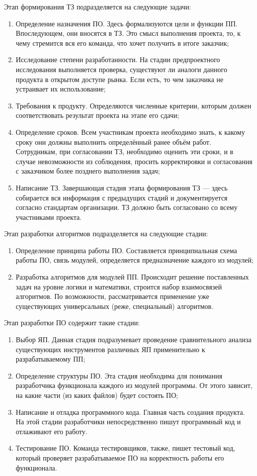 Этап формирования ТЗ подразделяется на следующие задачи:

\begin{enumerate}
	\item Определение назначения ПО. Здесь формализуются цели и функции ПП. Впоследующем, они вносятся в ТЗ. Это смысл выполнения проекта, то, к чему стремится вся его команда, что хочет получить в итоге заказчик;
	\item Исследование степени разработанности. На стадии предпроектного исследования выполняется проверка, существуют ли аналоги данного продукта в открытом доступе рынка. Если есть, то чем заказчика не устраивает их использование;
	\item Требования к продукту. Определяются численные критерии, которым должен соответствовать результат проекта на этапе его сдачи;
	\item Определение сроков. Всем участникам проекта необходимо знать, к какому сроку они должны выполнить определённый ранее объём работ. Сотрудникам, при согласовании ТЗ, необходимо оценить эти сроки, и в случае невозможности из соблюдения, просить корректировки и согласования с заказчиком более позднего выполнения задач;
	\item Написание ТЗ. Завершающая стадия этапа формирования ТЗ --- здесь собирается вся информация с предыдущих стадий и документируется согласно стандартам организации. ТЗ должно быть согласовано со всему участниками проекта.
\end{enumerate}

Этап разработки алгоритмов подразделяется на следующие стадии:
\begin{enumerate}
	\item Определение принципа работы ПО. Составляется принципиальная схема работы ПО, связь модулей, определяется предназначение каждого из модулей;
	\item Разработка алгоритмов для модулей ПП. Происходит решение поставленных задач на уровне логики и математики, строится набор взаимосвязей алгоритмов. По возможности, рассматривается применение уже существующих универсальных (реже, специальный) алгоритмов.
\end{enumerate}

Этап разработки ПО содержит такие стадии:
\begin{enumerate}
	\item Выбор ЯП. Данная стадия подразумевает проведение сравнительного анализа существующих инструментов различных ЯП применительно к разрабатываемому ПП;
	\item Определение структуры ПО. Эта стадия необходима для понимания разработчика функционала каждого из модулей программы. От этого зависит, на какие части (из каких файлов) будет состоять ПО;
	\item Написание и отладка программного кода. Главная часть создания продукта. На этой стадии разработчики непосредственно пишут программный код и отлаживают его работу.
	\item Тестирование ПО. Команда тестировщиков, также, пишет тестовый код, который проверяет разрабатываемое ПО на корректность работы его функционала.
\end{enumerate}

